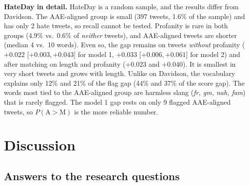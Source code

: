 \documentclass[runningheads,a4paper,oribibl]{llncs}
\begin{document}
\textbf{HateDay in detail.} HateDay is a random sample, and the results differ from Davidson.
The AAE-aligned group is small (397 tweets, 1.6\% of the sample) and has only 2 hate tweets,
so recall cannot be tested. Profanity is rare in both groups (4.9\% vs.\ 0.6\% of \emph{neither}
tweets), and AAE-aligned tweets are shorter (median 4 vs.\ 10 words). Even so, the gap remains
on tweets \emph{without} profanity ($+0.022$ [$+0.003,+0.043$] for model 1, $+0.033$
[$+0.006,+0.061$] for model 2) and after matching on length and profanity ($+0.023$ and $+0.040$).
It is smallest in very short tweets and grows with length. Unlike on Davidson, the vocabulary
explains only 12\% and 21\% of the flag gap (44\% and 37\% of the score gap). The words most tied
to the AAE-aligned group are harmless slang (\emph{fr, gm, nah, fam}) that is rarely flagged.
The model 1 gap rests on only 9 flagged AAE-aligned tweets, so $P(\mathrm{A}{>}\mathrm{M})$
is the more reliable number.

\section{Discussion}

\subsection{Answers to the research questions}
\end{document}
